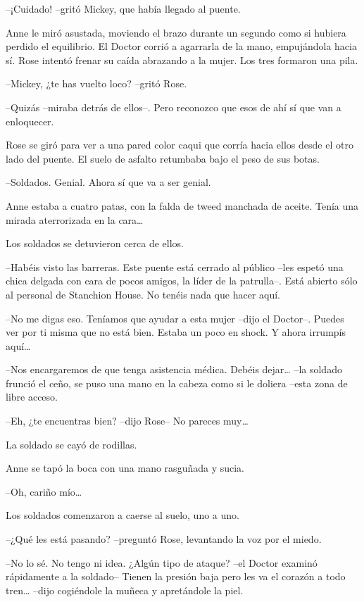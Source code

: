{--¡Cuidado! --gritó Mickey, que había llegado al puente.}

{Anne le miró asustada, moviendo el brazo durante un segundo como si
 hubiera perdido el equilibrio. El Doctor corrió a agarrarla de la mano,
 empujándola hacia sí. Rose intentó frenar su caída abrazando a la mujer.
Los tres formaron una pila.}

{--Mickey, ¿te has vuelto loco? --gritó Rose.}

{--Quizás --miraba detrás de ellos--. Pero reconozco que esos de ahí sí
que van a enloquecer.}

{Rose se giró para ver a una pared color caqui que corría hacia ellos
 desde el otro lado del puente. El suelo de asfalto retumbaba bajo el
peso de sus botas.}

{--Soldados. Genial. Ahora sí que va a ser genial.}

{Anne estaba a cuatro patas, con la falda de tweed manchada de aceite.
 Tenía una mirada aterrorizada en la cara\ldots{}}

{Los soldados se detuvieron cerca de ellos.}

{--Habéis visto las barreras. Este puente está cerrado al público --les
 espetó una chica delgada con cara de pocos amigos, la líder de la
 patrulla--. Está abierto sólo al personal de Stanchion House. No tenéis
nada que hacer aquí.}

{--No me digas eso. Teníamos que ayudar a esta mujer --dijo el Doctor--.
 Puedes ver por ti misma que no está bien. Estaba un poco en shock. Y
 ahora irrumpís aquí\ldots{}}

{--Nos encargaremos de que tenga asistencia médica. Debéis dejar\ldots{}
 --la soldado frunció el ceño, se puso una mano en la cabeza como si le
doliera --esta zona de libre acceso.}

{--Eh, ¿te encuentras bien? --dijo Rose-- No pareces muy\ldots{}}

{La soldado se cayó de rodillas.}

{Anne se tapó la boca con una mano rasguñada y sucia.}

{--Oh, cariño mío\ldots{}}

{Los soldados comenzaron a caerse al suelo, uno a uno.}

{--¿Qué les está pasando? --preguntó Rose, levantando la voz por el
miedo.}

{--No lo sé. No tengo ni idea. ¿Algún tipo de ataque? --el Doctor
 examinó rápidamente a la soldado-- Tienen la presión baja pero les va el
 corazón a todo tren\ldots{} --dijo cogiéndole la muñeca y apretándole la
piel.}

